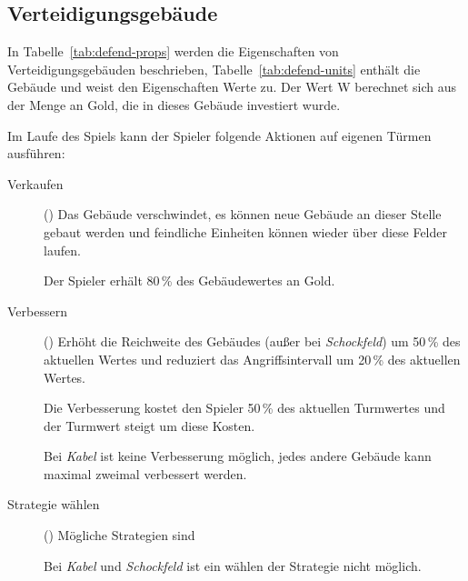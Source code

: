 \subsection{Verteidigungsgebäude}

In Tabelle~\ref{tab:defend-props} werden die Eigenschaften von
Verteidigungsgebäuden beschrieben, Tabelle~\ref{tab:defend-units} enthält die
Gebäude und weist den Eigenschaften Werte zu. Der Wert W berechnet sich aus der
Menge an Gold, die in dieses Gebäude investiert wurde.

Im Laufe des Spiels kann der Spieler folgende Aktionen auf eigenen Türmen
ausführen:

\begin{description}
  \item[Verkaufen] () Das Gebäude verschwindet, es können
    neue Gebäude an dieser Stelle gebaut werden und feindliche Einheiten können
    wieder über diese Felder laufen.

    Der Spieler erhält 80\,\% des Gebäudewertes an Gold.

  \item[Verbessern] () Erhöht die Reichweite des
    Gebäudes (außer bei \emph{Schockfeld}) um 50\,\% des aktuellen Wertes und
    reduziert das Angriffsintervall um 20\,\% des aktuellen Wertes.

    Die Verbesserung kostet den Spieler 50\,\% des aktuellen Turmwertes und der
    Turmwert steigt um diese Kosten.

    Bei \emph{Kabel} ist keine Verbesserung möglich, jedes andere Gebäude kann
    maximal zweimal verbessert werden.

  \item[Strategie wählen] () Mögliche Strategien sind

    Bei \emph{Kabel} und \emph{Schockfeld} ist ein wählen der Strategie nicht
    möglich.

\end{description}


